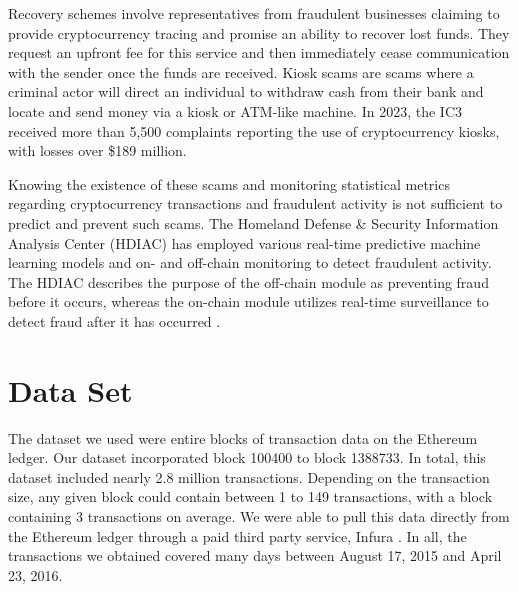 \documentclass[sigconf]{acmart}
\begin{document}
Recovery schemes involve representatives from fraudulent businesses claiming to provide cryptocurrency tracing and promise an ability to recover lost funds. They request an upfront fee for this service and then immediately cease communication with the sender once the funds are received. Kiosk scams are scams where a criminal actor will direct an individual to withdraw cash from their bank and locate and send money via a kiosk or ATM-like machine. In 2023, the IC3 received more than 5,500 complaints reporting the use of cryptocurrency kiosks, with losses over \$189 million.

Knowing the existence of these scams and monitoring statistical metrics regarding cryptocurrency transactions and fraudulent activity is not sufficient to predict and prevent such scams. The Homeland Defense \& Security Information Analysis Center (HDIAC) has employed various real-time predictive machine learning models and on- and off-chain monitoring to detect fraudulent activity. The HDIAC describes the purpose of the off-chain module as preventing fraud before it occurs, whereas the on-chain module utilizes real-time surveillance to detect fraud after it has occurred \cite{HDIAC2023}.


\section{Data Set}

The dataset we used were entire blocks of transaction data on the Ethereum ledger. Our dataset incorporated block 100400 to block 1388733. In total, this dataset included nearly 2.8 million transactions. Depending on the transaction size, any given block could contain between 1 to 149 transactions, with a block containing 3 transactions on average. We were able to pull this data directly from the Ethereum ledger through a paid third party service, Infura \cite{InfuraURL}. In all, the transactions we obtained covered many days between August 17, 2015 and April 23, 2016. 
\end{document}
